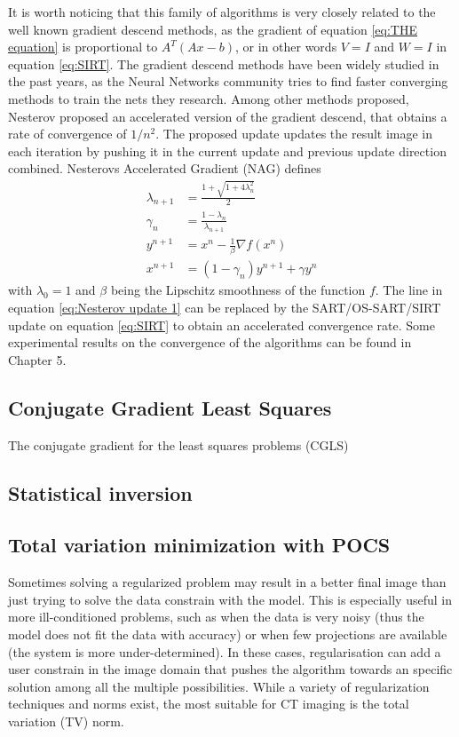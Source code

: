 It is worth noticing that this family of algorithms is very closely related to the well known gradient descend methods, as the gradient of equation \ref{eq:THE equation} is  proportional to $A^T(Ax-b)$, or in other words $V=I$ and $W=I$ in equation \ref{eq:SIRT}. The gradient descend methods have been widely studied in the past years\cite{sutskever2013importance}\cite{DBLP:journals/corr/Ruder16}, as the Neural Networks community tries to find faster converging methods to train the nets they research. Among other methods proposed, Nesterov proposed an accelerated version of the gradient descend\cite{nesterov1983method}, that obtains a rate of convergence of $1/n^2$. The proposed update   updates the result image in each iteration by pushing it in the current update and previous update direction combined. Nesterovs Accelerated Gradient (NAG) defines
\begin{align}
\lambda_{n+1}&=\frac{1+\sqrt{1+4\lambda_{n}^2}}{2}\\
\gamma_n&=\frac{1-\lambda_n}{\lambda_{n+1}}\\
y^{n+1}&=x^{n}-\frac{1}{\beta}\nabla f(x^n)\label{eq:Nesterov update 1}\\ 
x^{n+1}&=(1-\gamma_n)y^{n+1}+\gamma y^n
\end{align}
with $\lambda_0=1$ and $\beta$ being the Lipschitz smoothness of the function $f$. The line in equation \ref{eq:Nesterov update 1} can be replaced by the SART/OS-SART/SIRT update on equation \ref{eq:SIRT} to obtain an accelerated convergence rate. Some experimental results on the convergence of the algorithms can be found in Chapter 5.
\subsection{Conjugate Gradient Least Squares}

The conjugate gradient for the least squares problems (CGLS) 
\subsection{Statistical inversion}
\subsection{Total variation minimization with POCS}

Sometimes solving a regularized problem may result in a better final image than just trying to solve the data constrain with the model. This is especially useful in more ill-conditioned problems, such as when the data is very noisy (thus the model does not fit the data with accuracy) or when few projections are available (the system is more under-determined). In these cases, regularisation can add a user constrain in the image domain that pushes the algorithm towards an specific solution among all the multiple possibilities. While a variety of regularization techniques and norms exist, the most suitable for CT imaging is the total variation (TV) norm.

